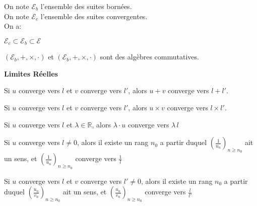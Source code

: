 \documentclass[12pt,twoside,a4paper]{article}
\begin{document}
		\begin{prop}
			On note $\mathcal{E}_b$ l'ensemble des suites bornées.\\
			On note $\mathcal{E}_c$ l'ensemble des suites convergentes.\\
			On a:
			\begin{liste}
				\item$\mathcal{E}_c\subset\mathcal{E}_b\subset\mathcal{E}$
				\item$(\mathcal{E}_b,+,\times,\cdot)$ et $(\mathcal{E}_b,+,\times,\cdot)$ sont des algèbres commutatives.
			\end{liste}
		\end{prop}
		\newpage
		\begin{flushleft}
			\textbf{Limites Réelles}
		\end{flushleft}
		\begin{prop}
			\begin{liste}
				\item Si $u$ converge vers $l$ et $v$ converge vers $l'$, alors $u+v$ converge vers $l+l'$.
				\item Si $u$ converge vers $l$ et $v$ converge vers $l'$, alors $u\times v$ converge vers $l\times l'$.
				\item Si $u$ converge vers $l$ et $\lambda\in\mathbb{R}$, alors $\lambda\cdot u$ converge vers $\lambda\,l$
				\item Si $u$ converge vers $l\neq0$, alors il existe un rang $n_0$ a partir duquel $\left(\frac{1}{u_n}\right)_{n\geq n_0}$ ait un sens, et $\left(\frac{1}{u_n}\right)_{n\geq n_0}$ converge vers $\frac{1}{l}$
				\item Si $u$ converge vers $l$ et $v$ converge vers $l'\neq0$, alors il existe un rang $n_0$ a partir duquel $\left(\frac{u_n}{v_n}\right)_{n\geq n_0}$ ait un sens, et $\left(\frac{u_n}{v_n}\right)_{n\geq n_0}$ converge vers $\frac{l}{l'}$
			\end{liste}
		\end{prop}
\end{document}
